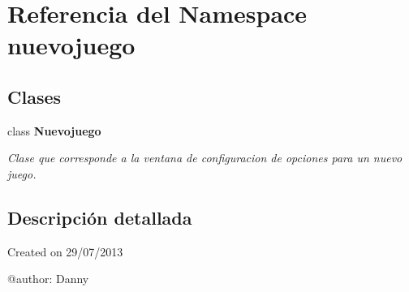 \section{Referencia del Namespace nuevojuego}
\label{namespacenuevojuego}
\subsection*{Clases}
\begin{DoxyCompactItemize}
\item 
class {\bf Nuevojuego}
\begin{DoxyCompactList}\small\item\em Clase que corresponde a la ventana de configuracion de opciones para un nuevo juego. \end{DoxyCompactList}\end{DoxyCompactItemize}


\subsection{Descripción detallada}
\begin{DoxyVerb}Created on 29/07/2013

@author: Danny
\end{DoxyVerb}
 